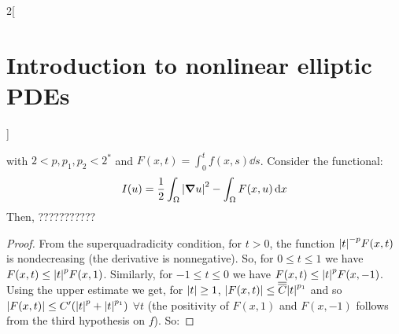\documentclass[../../../main_math.tex]{subfiles}
\begin{document}
\begin{multicols}{2}[\section{Introduction to nonlinear elliptic PDEs}]
\begin{proposition}
    with $2<p,p_1,p_2<2^*$ and $F(x,t)=\int_0^tf(x,s)\dd{s}$. Consider the functional:
    $$
      I(u)=\frac{1}{2}\int_\Omega \abs{\grad u}^2-\int_\Omega F(x,u)\dd{x}
    $$
    Then, ???????????
  \end{proposition}
  \begin{proof}
    From the superquadradicity condition, for $t>0$, the function $\abs{t}^{-p}F(x,t)$ is nondecreasing (the derivative is nonnegative). So, for $0\leq t\leq 1$ we have $F(x,t)\leq \abs{t}^p F(x,1)$. Similarly, for $-1\leq t\leq 0$ we have $F(x,t)\leq \abs{t}^p F(x,-1)$. Using the upper estimate we get, for $\abs{t}\geq 1$, $\abs{F(x,t)}\leq \overline{\overline{C}} \abs{t}^{p_1}$ and so
    $\abs{F(x,t)}\leq C'(\abs{t}^p+\abs{t}^{p_1})$ $\forall t$ (the positivity of $F(x,1)$ and $F(x,-1)$ follows from the third hypothesis on $f$). So:
  \end{proof}
\end{multicols}
\end{document}
